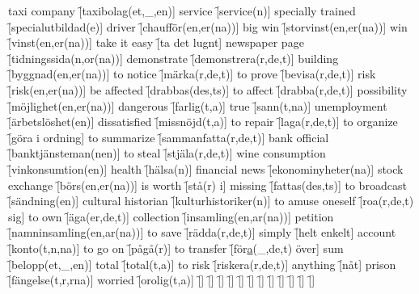 \begin{questions}
\begin{multicols}{2}
        \question taxi company \f[taxibolag(et,\_,en)]
        \question service \f[service(n)]
        \question specially trained \f[specialutbildad(e)]
        \question driver \f[chaufför(en,er(na))]
        \question big win \f[storvinst(en,er(na))]
        \question win \f[vinst(en,er(na))]
        \question take it easy \f[ta det lugnt]
        \question newspaper page \f[tidningssida(n,or(na))]
        \question demonstrate \f[demonstrera(r,de,t)]
        \question building \f[byggnad(en,er(na))]
        \question to notice \f[märka(r,de,t)]
        \question to prove \f[bevisa(r,de,t)]
        \question risk \f[risk(en,er(na))]
        \question be affected \f[drabbas(des,ts)]
        \question to affect \f[drabba(r,de,t)]
        \question possibility \f[möjlighet(en,er(na))]
        \question dangerous \f[farlig(t,a)]
        \question true \f[sann(t,na)]
        \question unemployment \f[ärbetslöshet(en)]
        \question dissatisfied \f[missnöjd(t,a)]
        \question to repair \f[laga(r,de,t)]
        \question to organize \f[göra i ordning]
        \question to summarize \f[sammanfatta(r,de,t)]
        \question bank official \f[banktjänsteman(nen)]
        \question to steal \f[stjäla(r,de,t)]
        \question wine consumption \f[vinkonsumtion(en)]
        \question health \f[hälsa(n)]
        \question financial news \f[ekonominyheter(na)]
        \question stock exchange \f[börs(en,er(na))]
        \question is worth \f[stå(r) i]
        \question missing \f[fattas(des,ts)]
        \question to broadcast \f[sändning(en)]
        \question cultural historian \f[kulturhistoriker(n)]
        \question to amuse oneself \f[roa(r,de,t) sig]
        \question to own \f[äga(er,de,t)]
        \question collection \f[insamling(en,ar(na))]
        \question petition \f[namninsamling(en,ar(na))]
        \question to save \f[rädda(r,de,t)]
        \question simply \f[helt enkelt]
        \question account \f[konto(t,n,na)]
        \question to go on \f[pågå(r)]
        \question to transfer \f[för\underline{a}(\_,de,t) över]
        \question sum \f[belopp(et,\_,en)]
        \question total \f[total(t,a)]
        \question to risk \f[riskera(r,de,t)]
        \question anything \f[nåt]
        \question prison \f[fängelse(t,r,rna)]
        \question worried \f[orolig(t,a)]
        \question  \f[]
        \question  \f[]
        \question  \f[]
        \question  \f[]
        \question  \f[]
        \question  \f[]
        \question  \f[]
        \question  \f[]
        \question  \f[]
        \question  \f[]
        \question  \f[]
        \question  \f[]

\end{multicols}
\end{questions}
